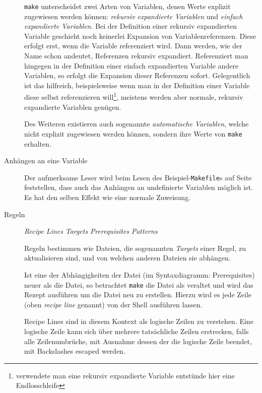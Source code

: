 \begin{description}
		\texttt{make} unterscheidet zwei Arten von Variablen, denen Werte
		explizit zugewiesen werden können: \emph{rekursiv expandierte Variablen}
		und \emph{einfach expandierte Variablen}.
		Bei der Definition einer rekursiv expandierten Variable geschieht noch
		keinerlei Expansion von Variablenreferenzen. Diese erfolgt erst, wenn
		die Variable referenziert wird. Dann werden, wie der Name schon
		andeutet, Referenzen rekursiv expandiert.
		Referenziert man hingegen in der Definition einer einfach expandierten
		Variable andere Variablen, so erfolgt die Expansion dieser Referenzen
		sofort. Gelegentlich ist das hilfreich, beispielsweise wenn man in der
		Definition einer Variable diese selbst referenzieren
		will\footnote{verwendete man eine rekursiv expandierte Variable
		entstünde hier eine Endlosschleife}, meistens werden aber normale,
		rekursiv expandierte Variablen genügen.
		
		Des Weiteren existieren auch sogenannte \emph{automatische Variablen},
		welche nicht explizit zugewiesen werden können, sondern ihre Werte von
		\texttt{make} erhalten.
	\item[Anhängen an eine Variable] \hspace{\fill}
	
		
		Der aufmerksame Leser wird beim Lesen des Beispiel-\texttt{Makefile}s
		auf Seite~\pageref{subsubsection:examplemakefile} feststellen, dass
		auch das Anhängen an undefinierte Variablen möglich ist. Es hat den
		selben Effekt wie eine normale Zuweisung.

	\item[Regeln] \hspace{\fill}
		
		\textit{Recipe Lines} 
		\textit{Targets} 
		\textit{Prerequisites} 
		\textit{Patterns} 

		Regeln bestimmen wie Dateien, die sogenannten \emph{Targets} einer
		Regel, zu aktualisieren sind, und von welchen anderen Dateien sie abhängen.
		
		Ist eine der Abhängigkeiten der Datei (im Syntaxdiagramm: Prerequisites)
		neuer als die Datei, so betrachtet \texttt{make} die Datei als veraltet
		und wird das Rezept ausführen um die Datei neu zu erstellen. Hierzu wird
		es jede Zeile (oben \textit{recipe line} genannt) von der Shell
		ausführen lassen.

		Recipe Lines sind in diesem Kontext als logische Zeilen zu verstehen.
		Eine logische Zeile kann sich über mehrere tatsächliche Zeilen
		erstrecken, falls alle Zeilenumbrüche, mit Ausnahme dessen der die
		logische Zeile beendet, mit Backslashes escaped werden.
	
\end{description}
